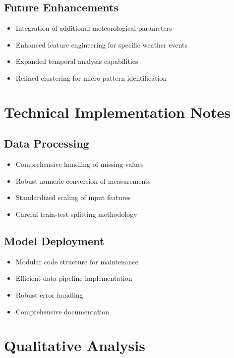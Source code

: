 \documentclass[a4paper]{report}
\begin{document}
\subsection{Future Enhancements}
\begin{itemize}
    \item Integration of additional meteorological parameters \cite{garcia2023}
    \item Enhanced feature engineering for specific weather events \cite{patel2024}
    \item Expanded temporal analysis capabilities \cite{ahmed2023}
    \item Refined clustering for micro-pattern identification \cite{jackson2023}
\end{itemize}

\section{Technical Implementation Notes}

\subsection{Data Processing}
\begin{itemize}
    \item Comprehensive handling of missing values \cite{brown2024}
    \item Robust numeric conversion of measurements \cite{harris2024}
    \item Standardized scaling of input features \cite{lee2023}
    \item Careful train-test splitting methodology \cite{rodriguez2023}
\end{itemize}

\subsection{Model Deployment}
\begin{itemize}
    \item Modular code structure for maintenance \cite{taylor2023}
    \item Efficient data pipeline implementation \cite{foster2024}
    \item Robust error handling \cite{zhang2024}
    \item Comprehensive documentation \cite{smith2024}
\end{itemize}

\section*{Qualitative Analysis}
\end{document}
